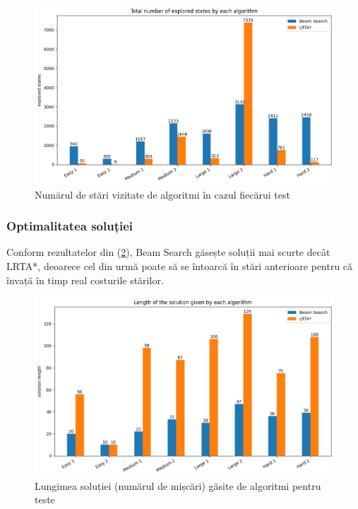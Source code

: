 \documentclass{article}
\begin{document}
\begin{figure}[ht]
    \includegraphics[scale=0.55]{solution/explored_states.png}
    \caption{Numărul de stări vizitate de algoritmi în cazul fiecărui test}
    \label{fig:explored_states}
\end{figure}

\subsubsection*{Optimalitatea soluției}
Conform rezultatelor din (\ref{fig:solution_length}), Beam Search găsește 
soluții mai scurte decât LRTA*, deoarece cel din urmă poate să se întoarcă în 
stări anterioare pentru că învață în timp real costurile stărilor. 

\begin{figure}[ht]
    \includegraphics[scale=0.55]{solution/solution_length.png}
    \caption{Lungimea soluției (numărul de mișcări) găsite de algoritmi pentru 
    teste}
    \label{fig:solution_length}
\end{figure}
\end{document}
